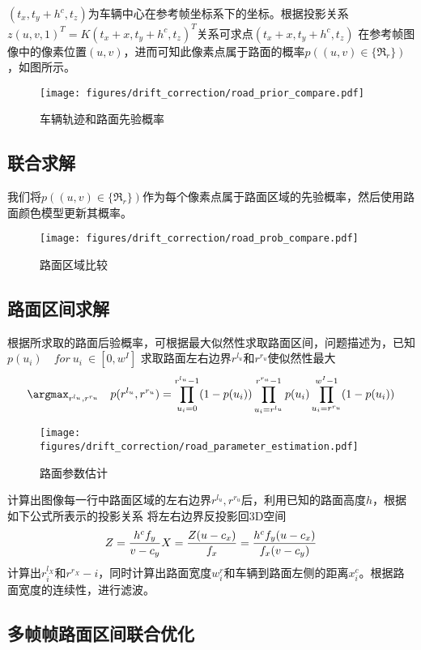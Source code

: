 $(t_x,t_y+h^c,t_z)$为车辆中心在参考帧坐标系下的坐标。根据投影关系$z(u,v,1)^T=K(t_x+x,t_y+h^c,t_z)^T$关系可求点$(t_x+x,t_y+h^c,t_z)$
在参考帧图像中的像素位置$(u,v)$，进而可知此像素点属于路面的概率$p((u,v)\in \{\Re_r\})$，如图所示。
\begin{figure}[h]
    \centering
    \texttt{[image: figures/drift\_correction/road\_prior\_compare.pdf]}
    \caption{车辆轨迹和路面先验概率}
    \label{fig:road_prob}
\end{figure}

\subsection{联合求解}
我们将$p((u,v)\in \{\Re_r\})$作为每个像素点属于路面区域的先验概率，然后使用路面颜色模型更新其概率。
\begin{figure}[h]
    \centering
    \texttt{[image: figures/drift\_correction/road\_prob\_compare.pdf]}
    \caption{路面区域比较}
    \label{fig:road_prob}
\end{figure}

\subsection{路面区间求解}
根据所求取的路面后验概率，可根据最大似然性求取路面区间，问题描述为，已知$p(u_i) \quad for\  u_i \ \in [0,w^I]$
求取路面左右边界$r^{l_u}$和$r^{r_u}$使似然性最大
\begin{equation}
    \argmax_{r^{l_u},r^{r_u}} \quad p(r^{l_u},r^{r_u})=\prod_{u_i=0}^{r^{l_u}-1}(1-p(u_i))\prod_{u_i=r^{l_u}}^{r^{r_u}-1}p(u_i)\prod_{u_i=r^{r_u}}^{w^I-1}(1-p(u_i))
\end{equation}
\begin{figure}[t]
    \centering
    \texttt{[image: figures/drift\_correction/road\_parameter\_estimation.pdf]}
    \caption{路面参数估计}
    \label{fig:road_para}
\end{figure}
计算出图像每一行中路面区域的左右边界$r^{l_u},r^{r_u}$后，利用已知的路面高度$h$，根据如下公式所表示的投影关系
将左右边界反投影回3D空间
\begin{equation}
    Z = \frac{h^cf_y}{v-c_y} \\
    X = \frac{Z(u-c_x)}{f_x}= \frac{h^cf_y(u-c_x)}{f_x(v-c_y)}
\end{equation}
计算出$r^{l_X}_i$和$r^{r_X}-i$，同时计算出路面宽度$w^r_i$和车辆到路面左侧的距离$x^c_i$。根据路面宽度的连续性，进行滤波。
\subsection{多帧帧路面区间联合优化}

